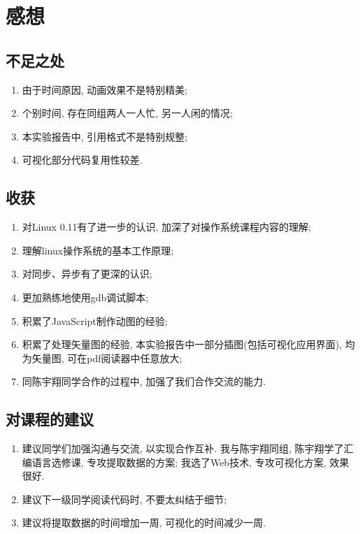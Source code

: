 \documentclass{ctexart}
\begin{document}
\section{感想}
\subsection{不足之处}
\begin{enumerate}
	\item 由于时间原因, 动画效果不是特别精美;
	\item 个别时间, 存在同组两人一人忙, 另一人闲的情况;
	\item 本实验报告中, 引用格式不是特别规整;
	\item 可视化部分代码复用性较差.
\end{enumerate}
\subsection{收获}
\begin{enumerate}
	\item 对Linux 0.11有了进一步的认识, 加深了对操作系统课程内容的理解;
	\item 理解linux操作系统的基本工作原理;
	\item 对同步、异步有了更深的认识;
	\item 更加熟练地使用gdb调试脚本;
	\item 积累了JavaScript制作动图的经验;
	\item 积累了处理矢量图的经验, 本实验报告中一部分插图(包括可视化应用界面), 均为矢量图, 可在pdf阅读器中任意放大;
	\item 同陈宇翔同学合作的过程中, 加强了我们合作交流的能力.
\end{enumerate}
\subsection{对课程的建议}
\begin{enumerate}
	\item 建议同学们加强沟通与交流, 以实现合作互补. 我与陈宇翔同组, 陈宇翔学了汇编语言选修课, 专攻提取数据的方案; 我选了Web技术, 专攻可视化方案, 效果很好.
	\item 建议下一级同学阅读代码时, 不要太纠结于细节;
	\item 建议将提取数据的时间增加一周, 可视化的时间减少一周.
\end{enumerate}
\end{document}
